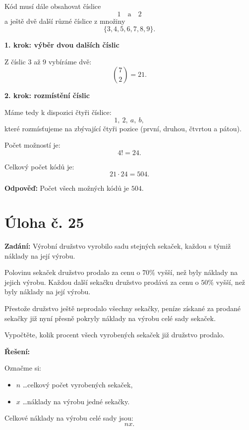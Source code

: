 \documentclass[12pt,a4paper]{article}
\begin{document}
Kód musí dále obsahovat číslice
\[
1 \quad \text{a} \quad 2
\]
a ještě dvě další různé číslice z množiny
\[
\{3,4,5,6,7,8,9\}.
\]

\medskip

\textbf{1. krok: výběr dvou dalších číslic}

Z číslic \(3\) až \(9\) vybíráme dvě:
\[
\binom{7}{2}=21.
\]

\medskip

\textbf{2. krok: rozmístění číslic}

Máme tedy k dispozici čtyři číslice:
\[
1,\ 2,\ a,\ b,
\]
které rozmísťujeme na zbývající čtyři pozice (první, druhou, čtvrtou a pátou).

Počet možností je:
\[
4! = 24.
\]

\medskip

Celkový počet kódů je:
\[
21\cdot 24=504.
\]

\bigskip

\textbf{Odpověď:}  
Počet všech možných kódů je \(504\).


\newpage
\section*{Úloha č. 25}

\textbf{Zadání:}  
Výrobní družstvo vyrobilo sadu stejných sekaček, každou s týmiž náklady na její výrobu.

Polovinu sekaček družstvo prodalo za cenu o \(70\%\) vyšší, než byly náklady na jejich výrobu.  
Každou další sekačku družstvo prodává za cenu o \(50\%\) vyšší, než byly náklady na její výrobu.

Přestože družstvo ještě neprodalo všechny sekačky, peníze získané za prodané sekačky již nyní přesně pokryly náklady na výrobu celé sady sekaček.

Vypočtěte, kolik procent všech vyrobených sekaček již družstvo prodalo.

\bigskip

\textbf{Řešení:}

Označme si:
\begin{itemize}
    \item \(n\) \dots celkový počet vyrobených sekaček,
    \item \(x\) \dots náklady na výrobu jedné sekačky.
\end{itemize}

Celkové náklady na výrobu celé sady jsou:
\[
nx.
\]
\end{document}
